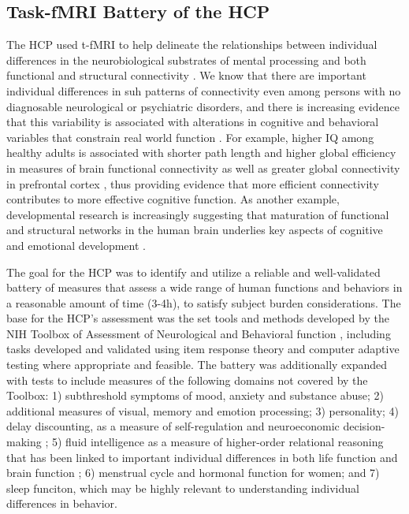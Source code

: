 \subsection{Task-fMRI Battery of the HCP}

The \gls{HCP} used \gls{t-fMRI} to help delineate the relationships between individual differences in the neurobiological substrates of mental processing and both functional and structural connectivity \cite{Barch2013}. We know that there are important individual differences in suh patterns of connectivity even among persons with no diagnosable neurological or psychiatric disorders, and there is increasing evidence that this variability is associated with alterations in cognitive and behavioral variables that constrain real world function \cite{Basset2009, Song2008, Heuvel2009}. For example, higher \gls{IQ} among healthy adults is associated with shorter path length and higher global efficiency in measures of brain functional connectivity \cite{Li2009} as well as greater global connectivity in prefrontal cortex \cite{Cole2012}, thus providing evidence that more efficient connectivity contributes to more effective cognitive function. As another example, developmental research is increasingly suggesting that maturation of functional and structural networks in the human brain underlies key aspects of cognitive and emotional development \cite{Fair2007, Fair2009, Hwang2013, Imperati2011, Stevens2009, Supekar2009, Zuo2010}.

The goal for the \gls{HCP} was to identify and utilize a reliable and well-validated battery of measures that assess a wide range of human functions and behaviors in a reasonable amount of time (3-4\si{\hour}), to satisfy subject burden considerations. The base for the \gls{HCP}'s  assessment was the set tools and methods developed by the \gls{NIH} Toolbox of Assessment of Neurological and Behavioral function \cite{NIH_Toolbox}, including tasks developed and validated using item response theory and computer adaptive testing where appropriate and feasible. The battery was additionally expanded with tests to include measures of the following domains not covered by the Toolbox: 1) subthreshold symptoms of mood, anxiety and substance abuse; 2) additional measures of visual, memory and emotion processing; 3) personality; 4) delay discounting, as a measure of self-regulation and neuroeconomic decision-making \cite{Dalley2008, Shamosh2008}; 5) fluid intelligence as a measure of higher-order relational reasoning that has been linked to important individual differences in both life function and brain function \cite{Burgess2011}; 6) menstrual cycle and hormonal function for women; and 7) sleep funciton, which may be highly relevant to understanding individual differences in behavior.

